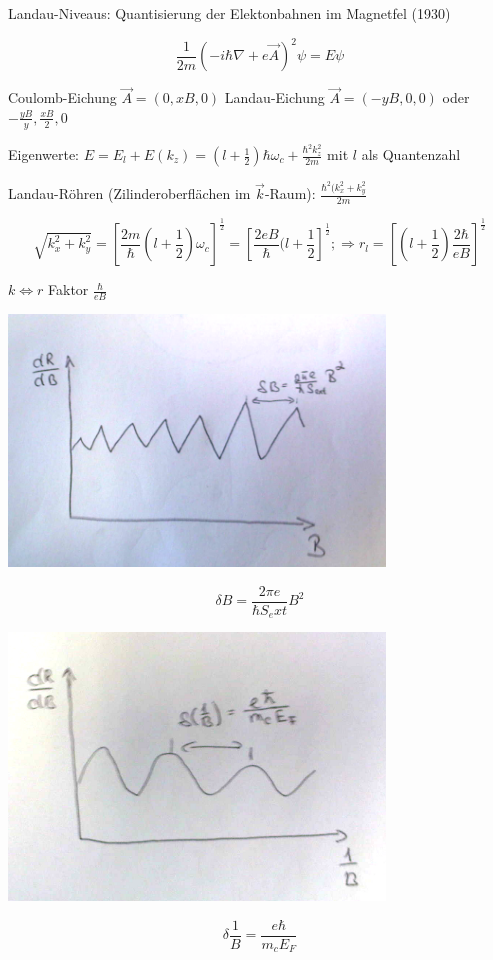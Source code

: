 Landau-Niveaus: Quantisierung der Elektonbahnen im Magnetfel (1930)

\[\frac{1}{2m}(-i\hbar\nabla + e\vec A)^2\psi = E\psi\]

Coulomb-Eichung \(\vec A = (0,xB,0)\)
Landau-Eichung \(\vec A = (-yB,0,0)\) oder \(-\frac{yB}{y},\frac{xB}{2},0\)

Eigenwerte: \(E = E_l  + E(k_z) = (l+\frac{1}{2})\hbar\omega_c+\frac{\hbar^2k^2_z}{2m}\) mit \(l\) als Quantenzahl

Landau-Röhren (Zilinderoberflächen im \(\vec k\)-Raum): \(\frac{\hbar^2(k^2_x+k^2_y}{2m}\)

\[\sqrt{k^2_x+k^2_y}=\left[\frac{2m}{\hbar}(l+\frac{1}{2})\omega_c\right]^{\frac{1}{2}} = \left[ \frac{2eB}{\hbar}(l+\frac{1}{2}\right]^{\frac{1}{2}}; \Rightarrow r_l=\left[(l+\frac{1}{2})\frac{2\hbar}{eB}\right]^{\frac{1}{2}}\]

\(k \Leftrightarrow r \) Faktor \(\frac{\hbar}{eB}\)


\includegraphics[width=0.75\textwidth]{kap10_09.png}

\[\delta B = \frac{2\pi e}{\hbar S_ext}B^2\]

\includegraphics[width=0.75\textwidth]{kap10_10.png}

\[\delta \frac{1}{B} = \frac{e\hbar}{m_c E_F}\]

